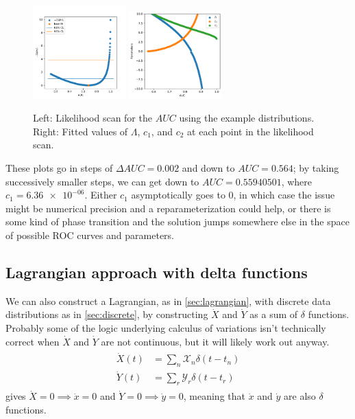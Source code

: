 \documentclass[11pt]{article}
\newcommand{\xdot}{\dot{x}}
\newcommand{\ydot}{\dot{y}}
\newcommand{\Xdot}{\dot{X}}
\newcommand{\Ydot}{\dot{Y}}
\newcommand{\AUC}{AUC}
\begin{document}
\begin{figure}
\begin{center}
\includegraphics[width=0.32\textwidth]{examplescan.pdf}
\includegraphics[width=0.32\textwidth]{exampleparameters.pdf}
\caption{Left: Likelihood scan for the \(\AUC\) using the example distributions.  Right: Fitted values of \(\Lambda\), \(c_1\), and \(c_2\) at each point in the likelihood scan.\label{fig:examplelikelihoodscan}}
\end{center}
\end{figure}

These plots go in steps of \(\Delta\AUC=\num{0.002}\) and down to \(\AUC=\num{0.564}\); by taking successively smaller steps, we can get down to \(\AUC=\num{0.55940501}\), where \(c_1=\num{6.36e-06}\).  Either \(c_1\) asymptotically goes to 0, in which case the issue might be numerical precision and a reparameterization could help, or there is some kind of phase transition and the solution jumps somewhere else in the space of possible ROC curves and parameters.

\subsection{Lagrangian approach with delta functions}

We can also construct a Lagrangian, as in \cref{sec:lagrangian}, with discrete data distributions as in \cref{sec:discrete}, by constructing \(\Xdot\) and \(\Ydot\) as a sum of \(\delta\) functions.  Probably some of the logic underlying calculus of variations isn't technically correct when \(\Xdot\) and \(\Ydot\) are not continuous, but it will likely work out anyway.
\begin{align}
\begin{aligned}
\Xdot(t)&=\sum_n \mathscr{X}_n\delta(t-t_n) \\
\Ydot(t)&=\sum_r \mathscr{Y}_r\delta(t-t_r) \label{eq:XdotYdotdelta}
\end{aligned}
\end{align}
 gives \(\Xdot=0\implies\xdot=0\) and \(\Ydot=0\implies\ydot=0\), meaning that \(\xdot\) and \(\ydot\) are also \(\delta\) functions.
\end{document}
